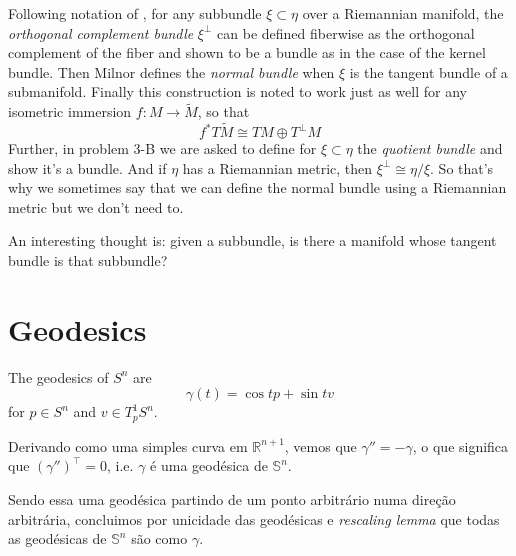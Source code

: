 Following notation of \cite{Milnor-Characteristic-Classes}, for any subbundle
$\xi \subset\eta$ over a Riemannian manifold, the {\it orthogonal complement
bundle} $\xi^\perp$ can be defined fiberwise as the orthogonal complement of the
fiber and shown to be a bundle as in the case of the kernel bundle. Then Milnor
defines the {\it normal bundle} when $\xi$ is the tangent bundle of a
submanifold. Finally this construction is noted to work just as well for any
isometric immersion $f:M\to \tilde{M}$, so that
\begin{equation}
\label{equation-immersion-bundle-decomposition}
f^*T\tilde{M}\cong TM\oplus T^\perp M
\end{equation}
Further, in problem 3-B we are asked to define for $\xi \subset \eta$ the {\it
quotient bundle} and show it's a bundle. And if $\eta$ has a Riemannian metric,
then $\xi^\perp\cong\eta/\xi$. So that's why we sometimes say that we can define
the normal bundle using a Riemannian metric but we don't need to.

An interesting thought is: given a subbundle, is there a manifold whose tangent
bundle is that subbundle?

\section{Geodesics}
\label{section-geodesics}

\begin{example}
\label{example-geodesics-of-Sn}
The geodesics of $S^n$ are 
\begin{equation}
\label{equation-geodesics-of-Sn}
\gamma(t)=\cos t p+\sin t v
\end{equation}
for $p \in S^n$ and $v\in T^1_pS^n$.

Derivando como uma simples curva em $\mathbb{R}^{n+1}$, vemos que
$\gamma''=-\gamma$, o que significa que $(\gamma'')^{\top}=0$, i.e. $\gamma$ é
uma geodésica de $\mathbb{S}^n$.

Sendo essa uma geodésica partindo de um ponto arbitrário numa direção
arbitrária, concluimos por unicidade das geodésicas e \textit{rescaling lemma}
que todas as geodésicas de $\mathbb{S}^n$ são como $\gamma$.
\end{example}

